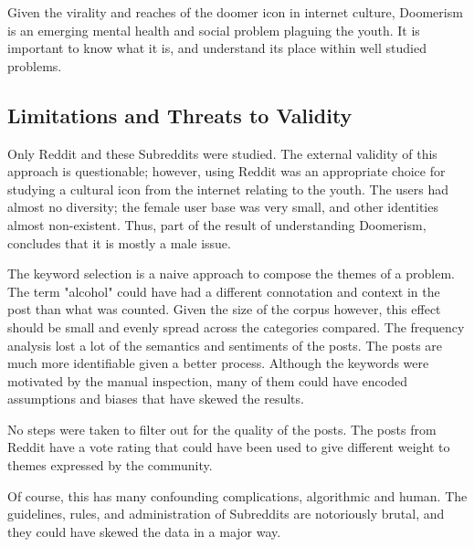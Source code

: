 \documentclass[../report.tex]{subfiles}
\begin{document}

Given the virality and reaches of the doomer icon in internet culture, Doomerism is an emerging mental health and social problem plaguing the youth. 
It is important to know what it is, and understand its place within well studied problems. 

\subsection{Limitations and Threats to Validity}


Only Reddit and these Subreddits were studied. 
The external validity of this approach is questionable; however, using Reddit was an appropriate choice for studying a cultural icon from the internet relating to the youth. 
The users had almost no diversity; the female user base was very small, and other identities almost non-existent.
Thus, part of the result of understanding Doomerism, concludes that it is mostly a male issue. 

The keyword selection is a naive approach to compose the themes of a problem.
The term "alcohol" could have had a different connotation and context in the post than what was counted.
Given the size of the corpus however, this effect should be small and evenly spread across the categories compared.
The frequency analysis lost a lot of the semantics and sentiments of the posts. 
The posts are much more identifiable given a better process.
Although the keywords were motivated by the manual inspection, many of them could have encoded assumptions and biases that have skewed the results.

No steps were taken to filter out for the quality of the posts. 
The posts from Reddit have a vote rating that could have been used to give different weight to themes expressed by the community.

Of course, this has many confounding complications, algorithmic and human.
The guidelines, rules, and administration of Subreddits are notoriously brutal, and they could have skewed the data in a major way.
\end{document}

